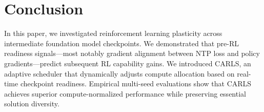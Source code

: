 \section{Conclusion}
\label{sec:conclusion}

In this paper, we investigated reinforcement learning plasticity across intermediate foundation model checkpoints. We demonstrated that pre-RL readiness signals—most notably gradient alignment between NTP loss and policy gradients—predict subsequent RL capability gains. We introduced CARLS, an adaptive scheduler that dynamically adjusts compute allocation based on real-time checkpoint readiness. Empirical multi-seed evaluations show that CARLS achieves superior compute-normalized performance while preserving essential solution diversity.
